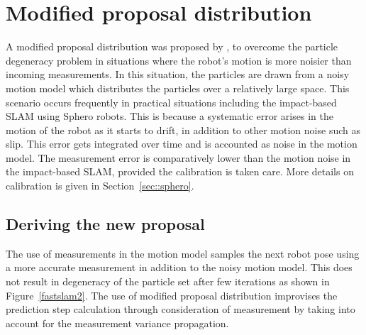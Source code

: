 
\chapter{Modified proposal distribution} \label{mod_prop}
A modified proposal distribution was proposed by \cite{montemerlo2007fastslam}, \cite{monte2002phd} to overcome the particle degeneracy problem in situations where the robot's motion is more noisier than incoming measurements. In this situation, the particles are drawn from a noisy motion model which distributes the particles over a relatively large space. This scenario occurs frequently in practical situations including the impact-based SLAM using Sphero robots. This is because a systematic error arises in the motion of the robot as it starts to drift, in addition to other motion noise such as slip. This error gets integrated over time and is accounted as noise in the motion model. The measurement error is comparatively lower than the motion noise in the impact-based SLAM, provided the calibration is taken care. More details on calibration is given in Section~\ref{sec::sphero}.

\section*{Deriving the new proposal}
The use of measurements in the motion model samples the next robot pose using a more accurate measurement in addition to the noisy motion model. This does not result in degeneracy of the particle set after few iterations as shown in Figure~\ref{fastslam2}. The use of modified proposal distribution improvises the prediction step calculation through consideration of measurement by taking into account for the measurement variance propagation.

